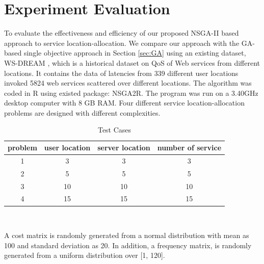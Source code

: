\documentclass{llncs}
\begin{document}
\section{Experiment Evaluation}
\label{sec:experiment}
To evaluate the effectiveness and efficiency of our proposed NSGA-II based approach to service location-allocation. We compare our approach with the GA-based single objective approach in Section \ref{sec:GA}
using an existing dataset, WS-DREAM \cite{6076756} \cite{5552800}, which is a historical dataset on QoS of Web services from different locations. It contains the data of latencies
from 339 different user locations invoked 5824 web services scattered over different locations.
The algorithm was coded in R \cite{Morandat:2012:EDR:2367163.2367172} using existed package: NSGA2R. The program was run on a 3.40GHz 
desktop computer with 8 GB RAM. Four different service location-allocation problems are designed with different complexities.
\begin{table}[h]
{\centering
	\caption{Test Cases}
	\begin{tabular}{|c|c|c|c|}
		\hline
		\multicolumn{1}{|l|}{problem} & \multicolumn{1}{l|}{user location} & \multicolumn{1}{l|}{server location} & \multicolumn{1}{l|}{number of service} \\\hline
		1                             & 3                                  & 3                                    & 3                                      \\\hline
		2                             & 5                                  & 5                                    & 5                                      \\\hline
		3                             & 10                                 & 10                                   & 10                                     \\\hline
		4                             & 15                                 & 15                                   & 15                                    \\
		\hline
	\end{tabular}
\\}
\end{table}
	A cost matrix is randomly generated from a normal distribution with mean as 100 and standard deviation as 20. In addition, a frequency matrix, is randomly generated from a uniform distribution over [1, 120].
\end{document}
